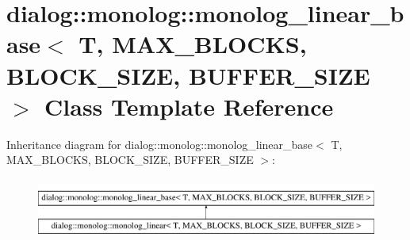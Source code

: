 \hypertarget{classdialog_1_1monolog_1_1monolog__linear__base}{}\section{dialog\+:\+:monolog\+:\+:monolog\+\_\+linear\+\_\+base$<$ T, M\+A\+X\+\_\+\+B\+L\+O\+C\+KS, B\+L\+O\+C\+K\+\_\+\+S\+I\+ZE, B\+U\+F\+F\+E\+R\+\_\+\+S\+I\+ZE $>$ Class Template Reference}
\label{classdialog_1_1monolog_1_1monolog__linear__base}
Inheritance diagram for dialog\+:\+:monolog\+:\+:monolog\+\_\+linear\+\_\+base$<$ T, M\+A\+X\+\_\+\+B\+L\+O\+C\+KS, B\+L\+O\+C\+K\+\_\+\+S\+I\+ZE, B\+U\+F\+F\+E\+R\+\_\+\+S\+I\+ZE $>$\+:\begin{figure}[H]
\begin{center}
\leavevmode
\includegraphics[height=2.000000cm]{classdialog_1_1monolog_1_1monolog__linear__base}
\end{center}
\end{figure}

